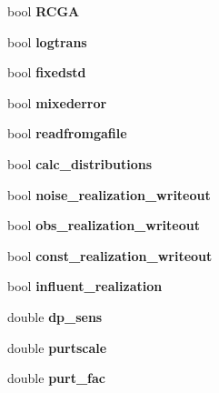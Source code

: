 \begin{DoxyCompactItemize}
bool {\bfseries R\+C\+GA}
\item 
\mbox{\label{class_c_g_a_a7c8beb39673765f31f4ac55d7e0d3747}} 
bool {\bfseries logtrans}
\item 
\mbox{\label{class_c_g_a_a3efd627cc06bee54bc9177ffe4e15604}} 
bool {\bfseries fixedstd}
\item 
\mbox{\label{class_c_g_a_ad3ba2c87b7f3ceede2db7b6b3cdb5c18}} 
bool {\bfseries mixederror}
\item 
\mbox{\label{class_c_g_a_af99d64dc92ee3103c3201d605d4391f6}} 
bool {\bfseries readfromgafile}
\item 
\mbox{\label{class_c_g_a_aab2f6d6a78b53af44a1f7985c31e9196}} 
bool {\bfseries calc\+\_\+distributions}
\item 
\mbox{\label{class_c_g_a_a56ec8ce3d4ea25ba9cc97937f139cd9d}} 
bool {\bfseries noise\+\_\+realization\+\_\+writeout}
\item 
\mbox{\label{class_c_g_a_a3786c6736e28d3ae0ea02225396e6aa6}} 
bool {\bfseries obs\+\_\+realization\+\_\+writeout}
\item 
\mbox{\label{class_c_g_a_a61ce7798fdaa2deff437f5713623a36d}} 
bool {\bfseries const\+\_\+realization\+\_\+writeout}
\item 
\mbox{\label{class_c_g_a_ae49541d7df1d7c315081616f240df182}} 
bool {\bfseries influent\+\_\+realization}
\item 
\mbox{\label{class_c_g_a_afd20954b4aca4b57bf0c844a35d10007}} 
double {\bfseries dp\+\_\+sens}
\item 
\mbox{\label{class_c_g_a_a1c684b018bdfa898d1e6672c4de74151}} 
double {\bfseries purtscale}
\item 
\mbox{\label{class_c_g_a_ac43e3b5047d1dae7205cb891fa4ee434}} 
double {\bfseries purt\+\_\+fac}
\item 
\mbox{\label{class_c_g_a_a8ff6bbac61540e06c23ef2c5cbc95ac5}} 

\end{DoxyCompactItemize}
